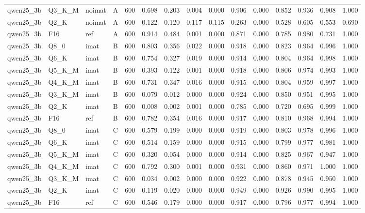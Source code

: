\begin{tabular}{llllrrrrrrrrrrr}
qwen25\_3b & Q3\_K\_M & noimat & A & 600 & 0.698 & 0.203 & 0.004 & 0.000 & 0.906 & 0.000 & 0.852 & 0.936 & 0.908 & 1.000 \\
qwen25\_3b & Q2\_K & noimat & A & 600 & 0.122 & 0.120 & 0.117 & 0.115 & 0.263 & 0.000 & 0.528 & 0.605 & 0.553 & 0.690 \\
qwen25\_3b & F16 & ref & A & 600 & 0.914 & 0.484 & 0.001 & 0.000 & 0.871 & 0.000 & 0.785 & 0.980 & 0.731 & 1.000 \\
qwen25\_3b & Q8\_0 & imat & B & 600 & 0.803 & 0.356 & 0.022 & 0.000 & 0.918 & 0.000 & 0.823 & 0.964 & 0.996 & 1.000 \\
qwen25\_3b & Q6\_K & imat & B & 600 & 0.754 & 0.327 & 0.019 & 0.000 & 0.914 & 0.000 & 0.804 & 0.964 & 0.998 & 1.000 \\
qwen25\_3b & Q5\_K\_M & imat & B & 600 & 0.393 & 0.122 & 0.001 & 0.000 & 0.918 & 0.000 & 0.806 & 0.974 & 0.993 & 1.000 \\
qwen25\_3b & Q4\_K\_M & imat & B & 600 & 0.731 & 0.347 & 0.016 & 0.000 & 0.915 & 0.000 & 0.804 & 0.959 & 0.997 & 1.000 \\
qwen25\_3b & Q3\_K\_M & imat & B & 600 & 0.079 & 0.012 & 0.000 & 0.000 & 0.924 & 0.000 & 0.850 & 0.951 & 0.995 & 1.000 \\
qwen25\_3b & Q2\_K & imat & B & 600 & 0.008 & 0.002 & 0.001 & 0.000 & 0.785 & 0.000 & 0.720 & 0.695 & 0.999 & 1.000 \\
qwen25\_3b & F16 & ref & B & 600 & 0.782 & 0.354 & 0.016 & 0.000 & 0.917 & 0.000 & 0.810 & 0.968 & 0.994 & 1.000 \\
qwen25\_3b & Q8\_0 & imat & C & 600 & 0.579 & 0.199 & 0.000 & 0.000 & 0.919 & 0.000 & 0.803 & 0.978 & 0.996 & 1.000 \\
qwen25\_3b & Q6\_K & imat & C & 600 & 0.514 & 0.159 & 0.000 & 0.000 & 0.915 & 0.000 & 0.799 & 0.977 & 0.981 & 1.000 \\
qwen25\_3b & Q5\_K\_M & imat & C & 600 & 0.320 & 0.054 & 0.000 & 0.000 & 0.914 & 0.000 & 0.825 & 0.967 & 0.947 & 1.000 \\
qwen25\_3b & Q4\_K\_M & imat & C & 600 & 0.792 & 0.300 & 0.001 & 0.000 & 0.931 & 0.000 & 0.860 & 0.971 & 1.000 & 1.000 \\
qwen25\_3b & Q3\_K\_M & imat & C & 600 & 0.034 & 0.002 & 0.000 & 0.000 & 0.922 & 0.000 & 0.878 & 0.945 & 0.950 & 1.000 \\
qwen25\_3b & Q2\_K & imat & C & 600 & 0.119 & 0.020 & 0.000 & 0.000 & 0.949 & 0.000 & 0.926 & 0.990 & 0.995 & 1.000 \\
qwen25\_3b & F16 & ref & C & 600 & 0.546 & 0.179 & 0.000 & 0.000 & 0.917 & 0.000 & 0.796 & 0.977 & 0.994 & 1.000 \\

\end{tabular}
